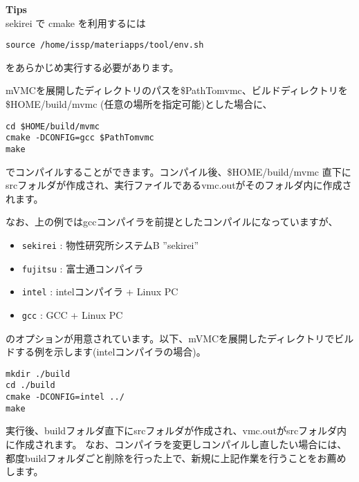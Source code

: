 \begin{screen}
\Large 
{\bf Tips}
\normalsize\\
sekirei で cmake を利用するには
\begin{verbatim}
source /home/issp/materiapps/tool/env.sh
\end{verbatim}
をあらかじめ実行する必要があります。
\end{screen}

mVMCを展開したディレクトリのパスを\$PathTomvmc、ビルドディレクトリを\$HOME/build/mvmc (任意の場所を指定可能)とした場合に、
\begin{verbatim}
cd $HOME/build/mvmc
cmake -DCONFIG=gcc $PathTomvmc
make
\end{verbatim}
でコンパイルすることができます。コンパイル後、\$HOME/build/mvmc 直下にsrcフォルダが作成され、実行ファイルであるvmc.outがそのフォルダ内に作成されます。

なお、上の例ではgccコンパイラを前提としたコンパイルになっていますが、
\begin{itemize}
\item \verb|sekirei| : 物性研究所システムB ''sekirei''
\item \verb|fujitsu| : 富士通コンパイラ
\item \verb|intel| : intelコンパイラ + Linux PC
\item \verb|gcc| : GCC + Linux PC
\end{itemize}
のオプションが用意されています。以下、mVMCを展開したディレクトリでビルドする例を示します(intelコンパイラの場合)。
\begin{verbatim}
mkdir ./build
cd ./build
cmake -DCONFIG=intel ../
make
\end{verbatim}
実行後、buildフォルダ直下にsrcフォルダが作成され、vmc.outがsrcフォルダ内に作成されます。
なお、コンパイラを変更しコンパイルし直したい場合には、都度buildフォルダごと削除を行った上で、新規に上記作業を行うことをお薦めします。

